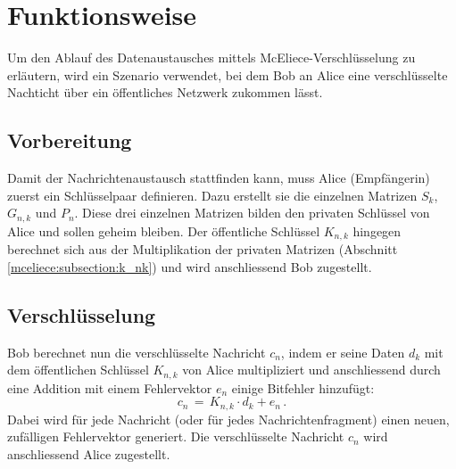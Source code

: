 %
%
%
\section{Funktionsweise 
\label{mceliece:section:funktionsweise}}
Um den Ablauf des Datenaustausches mittels McEliece-Verschlüsselung zu erläutern,
wird ein Szenario verwendet,
bei dem Bob an Alice eine verschlüsselte Nachticht über ein öffentliches Netzwerk zukommen lässt.

\subsection{Vorbereitung
\label{mceliece:section:vorbereitung}}
Damit der Nachrichtenaustausch stattfinden kann, muss Alice (Empfängerin)
zuerst ein Schlüsselpaar definieren.
Dazu erstellt sie die einzelnen Matrizen $S_k$, $G_{n,k}$ und $P_n$.
Diese drei einzelnen Matrizen bilden den privaten Schlüssel von Alice
und sollen geheim bleiben.
Der öffentliche Schlüssel $K_{n,k}$ hingegen berechnet sich
aus der Multiplikation der privaten Matrizen (Abschnitt \ref{mceliece:subsection:k_nk})
und wird anschliessend Bob zugestellt.

\subsection{Verschlüsselung
\label{mceliece:section:verschl}}
Bob berechnet nun die verschlüsselte Nachricht $c_n$, indem er seine Daten $d_k$
mit dem öffentlichen Schlüssel $K_{n,k}$ von Alice multipliziert
und anschliessend durch eine Addition mit einem Fehlervektor $e_n$ einige Bitfehler hinzufügt:
\[
    c_n\,=\,K_{n,k}\cdot d_k + e_n\,.
\]
Dabei wird für jede Nachricht (oder für jedes Nachrichtenfragment)
einen neuen, zufälligen Fehlervektor generiert.
Die verschlüsselte Nachricht $c_n$ wird anschliessend Alice zugestellt.

